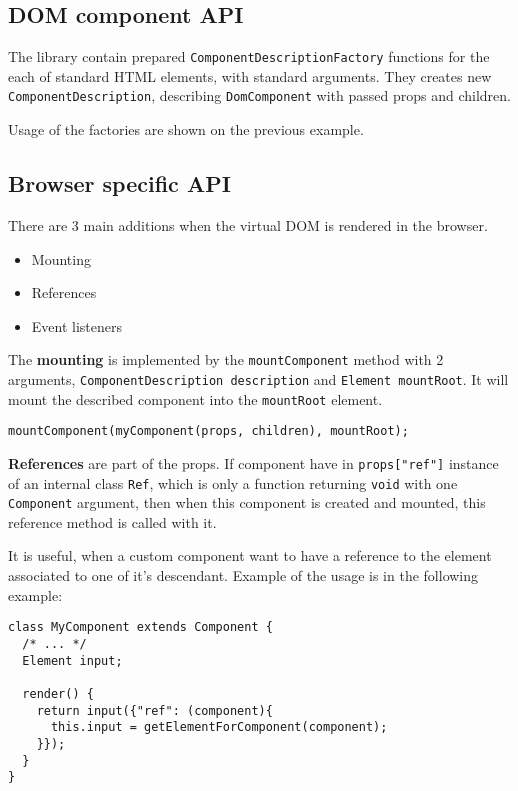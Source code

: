 \documentclass[oneside, 12pt]{book}
\begin{document}
  \subsection{DOM component API}\label{subsec:our-api-dom}

    The \tiles library contain prepared \texttt{ComponentDescriptionFactory} functions for the each of standard HTML elements, 
		with standard arguments. 
		They creates new \texttt{ComponentDescription}, describing \texttt{DomComponent} with passed props and children.

		Usage of the factories are shown on the previous example.

  \subsection{Browser specific API}\label{subsec:our-api-browser}
    
    There are 3 main additions when the virtual DOM is rendered in the browser.
    \begin{itemize}
      \item Mounting
      \item References
      \item Event listeners
    \end{itemize}

    The \textbf{mounting} is implemented by the \texttt{mountComponent} method with 2 arguments, 
    \texttt{ComponentDescription description} and \texttt{Element mountRoot}.
    It will mount the described component into the \texttt{mountRoot} element.
\begin{verbatim}
mountComponent(myComponent(props, children), mountRoot);
\end{verbatim}



    \textbf{References} are part of the props. 
		If component have in \texttt{props["ref"]} instance of an internal class \texttt{{\textunderscore}Ref}, 
		which is only a function returning \texttt{void} with one \texttt{Component} argument, 
		then when this component is created and mounted, 
    this reference method is called with it. 

    It is useful, when a custom component want to have a reference to the element associated to one of it's descendant. 
    Example of the usage is in the following example:
\begin{verbatim}
class MyComponent extends Component {
  /* ... */
  Element input;

  render() {
    return input({"ref": (component){
      this.input = getElementForComponent(component);
    }});
  }
}
\end{verbatim}
\end{document}
